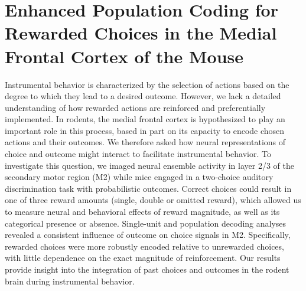 \chapter{Enhanced Population Coding for Rewarded Choices in the Medial Frontal Cortex of the Mouse}


Instrumental behavior is characterized by the selection of actions based on the degree to which they lead to a desired outcome. However, we lack a detailed understanding of how rewarded actions are reinforced and preferentially implemented. In rodents, the medial frontal cortex is hypothesized to play an important role in this process, based in part on its capacity to encode chosen actions and their outcomes. We therefore asked how neural representations of choice and outcome might interact to facilitate instrumental behavior. To investigate this question, we imaged neural ensemble activity in layer 2/3 of the secondary motor region (M2) while mice engaged in a two-choice auditory discrimination task with probabilistic outcomes. Correct choices could result in one of three reward amounts (single, double or omitted reward), which allowed us to measure neural and behavioral effects of reward magnitude, as well as its categorical presence or absence. Single-unit and population decoding analyses revealed a consistent influence of outcome on choice signals in M2. Specifically, rewarded choices were more robustly encoded relative to unrewarded choices, with little dependence on the exact magnitude of reinforcement. Our results provide insight into the integration of past choices and outcomes in the rodent brain during instrumental behavior.\\











